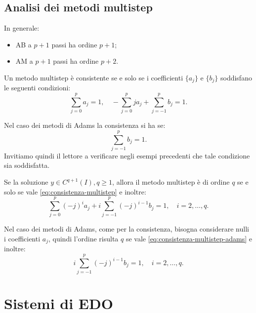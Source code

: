 \subsection{Analisi dei metodi multistep}
\label{sec:analisi-multistep}
In generale:
\begin{itemize}
\item AB a $p+1$ passi ha ordine $p+1$;
\item AM a $p+1$ passi ha ordine $p+2$.
\end{itemize}
\begin{theorem}
[Consistenza]
Un metodo multistep è consistente se e solo se i coefficienti $\{a_{j}\}$ e $\{b_{j}\}$ soddisfano le seguenti condizioni:
\begin{equation}
\sum\limits ^{p}_{j=0} a_{j} =1,\quad -\sum\limits ^{p}_{j=0} ja_{j} +\sum\limits ^{p}_{j=-1} b_{j} =1.
\label{eq:consistenza-multistep}
\end{equation}
\end{theorem}

Nel caso dei metodi di Adams la consistenza si ha se:
\begin{equation}
	\sum\limits ^{p}_{j=-1} b_{j} =1.
	\label{eq:consistenza-multistep-adams}
\end{equation}
Invitiamo quindi il lettore a verificare negli esempi precedenti che tale condizione sia soddisfatta.

\begin{theorem}
Se la soluzione $y\in C^{q+1}(I) ,q\geqslant 1$, allora il metodo multistep è di ordine $q$ se e solo se vale \eqref{eq:consistenza-multistep} e inoltre:
\begin{equation*}
\sum\limits ^{p}_{j=0}( -j)^{i} a_{j} +i\sum\limits ^{p}_{j=-1}( -j)^{i-1} b_{j} =1,\quad i=2,\dotsc ,q.
\end{equation*}
\end{theorem}

Nel caso dei metodi di Adams, come per la consistenza, bisogna considerare nulli i coefficienti $a_{j}$, quindi l'ordine risulta $q$ se vale \eqref{eq:consistenza-multistep-adams} e inoltre:
\begin{equation}
	i\sum\limits ^{p}_{j=-1}( -j)^{i-1} b_{j} =1,\quad i=2,\dotsc ,q.
\end{equation}

\section{Sistemi di EDO}

